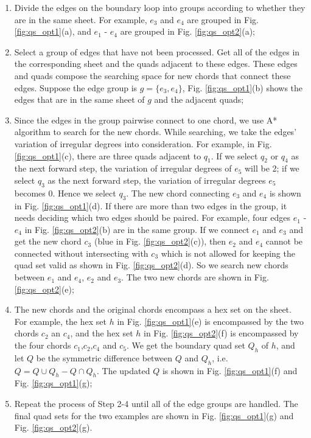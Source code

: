 \documentclass[final,5p,times,twocolumn]{elsarticle}
\begin{document}
\begin{enumerate}
  \item Divide the edges on the boundary loop into groups according to whether they are in the same sheet. For example, $e_3$ and $e_4$ are grouped in Fig. \ref{fig:qs_opt1}(a), and $e_1$ - $e_4$ are grouped in Fig. \ref{fig:qs_opt2}(a);
  \item Select a group of edges that have not been processed. Get all of the edges in the corresponding sheet and the quads adjacent to these edges. These edges and quads compose the searching space for new chords that connect these edges. Suppose the edge group is $g=\{e_3,e_4\}$, Fig. \ref{fig:qs_opt1}(b) shows the edges that are in the same sheet of $g$ and the adjacent quads;
  \item Since the edges in the group pairwise connect to one chord, we use A* algorithm to search for the new chords. While searching, we take the edges' variation of irregular degrees into consideration. For example, in Fig. \ref{fig:qs_opt1}(c), there are three quads adjacent to $q_1$. If we select $q_2$ or $q_4$ as the next forward step, the variation of irregular degrees of $e_5$ will be 2; if we select $q_3$ as the next forward step, the variation of irregular degrees $e_5$ becomes 0. Hence we select $q_3$. The new chord connecting $e_3$ and $e_4$ is shown in Fig. \ref{fig:qs_opt1}(d). If there are more than two edges in the group, it needs deciding which two edges should be paired. For example, four edges $e_1$ - $e_4$ in Fig. \ref{fig:qs_opt2}(b) are in the same group. If we connect $e_1$ and $e_3$ and get the new chord $c_3$ (blue in Fig. \ref{fig:qs_opt2}(c)), then $e_2$ and $e_4$ cannot be connected without intersecting with $c_3$ which is not allowed for keeping the quad set valid as shown in Fig. \ref{fig:qs_opt2}(d). So we search new chords between $e_1$ and $e_4$, $e_2$ and $e_3$. The two new chords are shown in Fig. \ref{fig:qs_opt2}(e);
  \item The new chords and the original chords encompass a hex set on the sheet. For example, the hex set $h$ in Fig. \ref{fig:qs_opt1}(e) is encompassed by the two chords $c_2$ an $c_4$, and the hex set $h$ in Fig. \ref{fig:qs_opt2}(f) is encompassed by the four chords $c_1$,$c_2$,$c_4$ and $c_5$. We get the boundary quad set $Q_h$ of $h$, and let $Q$ be the symmetric difference between $Q$ and $Q_h$, i.e. $Q=Q\cup Q_h-Q\cap Q_h$. The updated $Q$ is shown in Fig. \ref{fig:qs_opt1}(f) and Fig. \ref{fig:qs_opt1}(g);
  \item Repeat the process of Step 2-4 until all of the edge groups are handled. The final quad sets for the two examples are shown in Fig. \ref{fig:qs_opt1}(g) and Fig. \ref{fig:qs_opt2}(g).
\end{enumerate}
\end{document}
